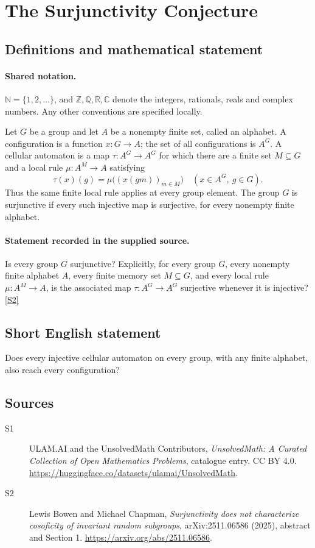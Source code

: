 \documentclass[11pt]{article}
\newcommand{\sref}[2]{\hyperlink{source:#1:#2}{[S#2]}}
\begin{document}
\section{The Surjunctivity Conjecture}\label{statement}

\subsection{Definitions and mathematical statement}

\paragraph{Shared notation.}$\mathbb N=\{1,2,\ldots\}$, and $\mathbb Z,\mathbb Q,\mathbb R,\mathbb C$ denote the integers, rationals, reals and complex numbers. Any other conventions are specified locally.


Let \(G\) be a group and let \(A\) be a nonempty finite set, called
an alphabet.  A configuration is a function \(x:G\to A\); the set of all
configurations is \(A^G\).  A cellular automaton is a map
\(\tau:A^G\to A^G\) for which there are a finite set \(M\subseteq G\)
and a local rule \(\mu:A^M\to A\) satisfying
\[
 \tau(x)(g)=\mu\bigl((x(gm))_{m\in M}\bigr)
       \quad (x\in A^G,\ g\in G).
\]
Thus the same finite local rule applies at every group element.
The group \(G\) is surjunctive if every such injective map is surjective,
for every nonempty finite alphabet.
\paragraph{Statement recorded in the supplied source.}
Is every group \(G\) surjunctive?  Explicitly, for every group
\(G\), every nonempty finite alphabet \(A\), every finite memory set
\(M\subseteq G\), and every local rule \(\mu:A^M\to A\), is the
associated map \(\tau:A^G\to A^G\) surjective whenever it is injective? \sref{statement}{2}
\subsection{Short English statement}
Does every injective cellular automaton on every group, with any finite alphabet, also reach every configuration?
\subsection{Sources}
\begin{description}
\item[\hypertarget{source:statement:1}{S1}] ULAM.AI and the UnsolvedMath Contributors, \emph{UnsolvedMath: A Curated Collection of Open Mathematics Problems}, catalogue entry. CC BY 4.0. \url{https://huggingface.co/datasets/ulamai/UnsolvedMath}.
\item[\hypertarget{source:statement:2}{S2}] Lewis Bowen and Michael Chapman, \emph{Surjunctivity does not characterize cosoficity of invariant random subgroups}, arXiv:2511.06586 (2025), abstract and Section 1. \url{https://arxiv.org/abs/2511.06586}.
\end{description}
\label{end:statement}
\end{document}
